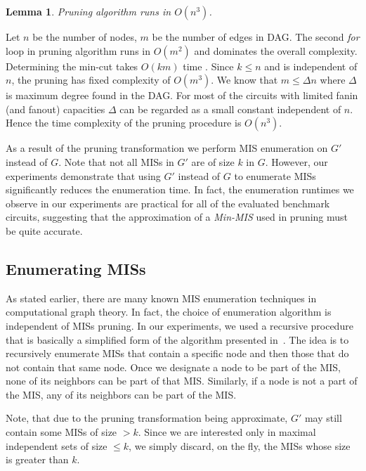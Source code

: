 \documentclass[journal]{IEEEtran}
\newtheorem{lemma}{Lemma}
\begin{document}
\begin{lemma}
Pruning algorithm runs in $O(n^3)$.
\end{lemma}
\begin{IEEEproof}
Let $n$ be the number of nodes, $m$ be the number of edges in DAG. The second \emph{for} loop in pruning algorithm runs in $O(m^2)$ and dominates the overall complexity. Determining the min-cut takes $O(km)$ time \cite{cormen2001introduction}. Since $k \leq n$ and is independent of $n$, the pruning has fixed complexity of $O(m^3)$. We know that $m \leq \Delta n$ where $\Delta$ is maximum degree found in the  DAG. For most of the circuits with limited fanin (and fanout) capacities $\Delta$ can be regarded as a small constant independent of $n$. Hence the time complexity of the pruning procedure is $O(n^3)$.
\end{IEEEproof}

As a result of the pruning transformation we perform MIS enumeration on $G'$ instead of $G$. Note that not all MISs in $G'$ are of size $k$ in $G$. However, our experiments demonstrate that using $G'$ instead of $G$ to enumerate MISs significantly reduces the enumeration time. In fact, the enumeration runtimes we observe in our experiments are practical for all of the evaluated benchmark circuits, suggesting that the approximation of a \emph{Min-MIS} used in pruning must be quite accurate.

\subsection{Enumerating MISs}

As stated earlier,  there are many known MIS enumeration techniques in computational graph theory.  In fact, the choice of enumeration algorithm is independent of  MISs pruning. In our experiments, we used a recursive procedure that is basically a simplified form of the algorithm presented in~\cite{byskov2003algorithms}. The idea is to recursively enumerate MISs that contain a specific node and then those that do not contain that same node. Once we designate a node to be part of the MIS, none of its neighbors can be part of that MIS. Similarly, if a node is not a part of the MIS, any of its neighbors can be part of the MIS. 



Note, that due to the pruning transformation being approximate, $G'$ may still contain some MISs of size $>k$. Since we are interested only in maximal independent sets of size $\leq k$, we simply discard, on the fly, the MISs whose size is greater than $k$.
\end{document}
